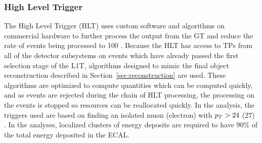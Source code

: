 \subsubsection{High Level Trigger}\label{sec:hlt}
The High Level Trigger (HLT)
 uses custom software and algorithms on
 commercial hardware to further process the 
 output from the GT and reduce the rate
 of events being processed to 100 \Hz.
Because the HLT has access to TPs from 
 all of the detector subsystems on events
 which have already passed the first selection 
 stage of the L1T,
 algorithms designed to mimic the final object
 reconstruction described in Section~\ref{sec:reconstruction}
 are used.
These algorithms are optimized to compute
 quantities which can be computed quickly,
 and as events are rejected during the chain
 of HLT processing, the processing on the
 events is stopped so resources can be reallocated
 quickly.
In the \ppwbb analysis, the triggers used 
 are based on finding an isolated muon (electron)
 with $p_T > 24$ ($27$) \GeV.
In the \pploneg analyses, localized clusters of energy deposits
 are required to have $90\%$ of the total
 energy deposited in the ECAL.


